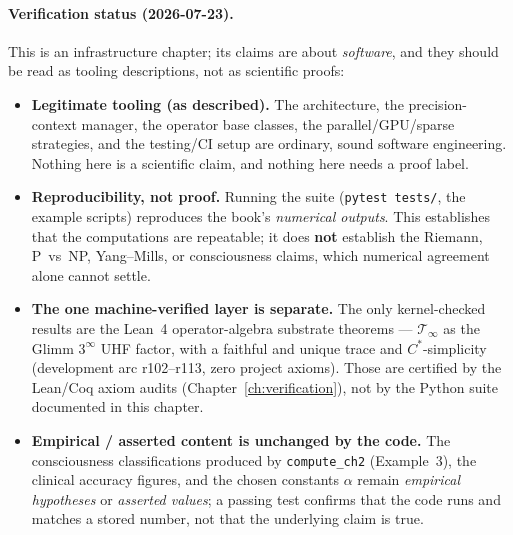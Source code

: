 \paragraph{Verification status (2026-07-23).}
This is an infrastructure chapter; its claims are about \emph{software}, and they should be read as tooling descriptions, not as scientific proofs:
\begin{itemize}
\item \textbf{Legitimate tooling (as described).} The architecture, the precision-context manager, the operator base classes, the parallel/GPU/sparse strategies, and the testing/CI setup are ordinary, sound software engineering. Nothing here is a scientific claim, and nothing here needs a proof label.
\item \textbf{Reproducibility, not proof.} Running the suite (\texttt{pytest tests/}, the example scripts) reproduces the book's \emph{numerical outputs}. This establishes that the computations are repeatable; it does \textbf{not} establish the Riemann, P~vs~NP, Yang--Mills, or consciousness claims, which numerical agreement alone cannot settle.
\item \textbf{The one machine-verified layer is separate.} The only kernel-checked results are the Lean~4 operator-algebra substrate theorems --- $\mathcal{T}_\infty$ as the Glimm $3^\infty$ UHF factor, with a faithful and unique trace and $C^*$-simplicity (development arc r102--r113, zero project axioms). Those are certified by the Lean/Coq axiom audits (Chapter~\ref{ch:verification}), not by the Python suite documented in this chapter.
\item \textbf{Empirical / asserted content is unchanged by the code.} The consciousness classifications produced by \texttt{compute\_ch2} (Example~3), the clinical accuracy figures, and the chosen constants $\alpha$ remain \emph{empirical hypotheses} or \emph{asserted values}; a passing test confirms that the code runs and matches a stored number, not that the underlying claim is true.
\end{itemize}
